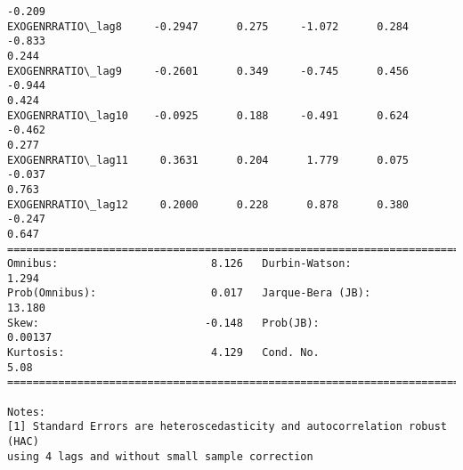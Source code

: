 \documentclass[11pt]{article}
\begin{document}
\begin{Verbatim}[commandchars=\\\{\}]
-0.209
EXOGENRRATIO\_lag8     -0.2947      0.275     -1.072      0.284      -0.833
0.244
EXOGENRRATIO\_lag9     -0.2601      0.349     -0.745      0.456      -0.944
0.424
EXOGENRRATIO\_lag10    -0.0925      0.188     -0.491      0.624      -0.462
0.277
EXOGENRRATIO\_lag11     0.3631      0.204      1.779      0.075      -0.037
0.763
EXOGENRRATIO\_lag12     0.2000      0.228      0.878      0.380      -0.247
0.647
==============================================================================
Omnibus:                        8.126   Durbin-Watson:                   1.294
Prob(Omnibus):                  0.017   Jarque-Bera (JB):               13.180
Skew:                          -0.148   Prob(JB):                      0.00137
Kurtosis:                       4.129   Cond. No.                         5.08
==============================================================================

Notes:
[1] Standard Errors are heteroscedasticity and autocorrelation robust (HAC)
using 4 lags and without small sample correction


\end{Verbatim}
\end{document}
